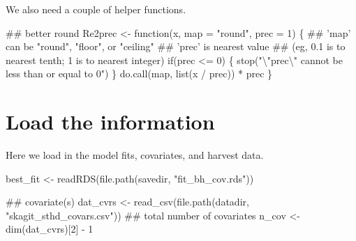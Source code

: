 \documentclass[11pt,]{article}
\newenvironment{Shaded}{}{}
\newcommand{\CharTok}[1]{\textcolor[rgb]{0.00,0.50,0.50}{#1}}
\newcommand{\CommentTok}[1]{\textcolor[rgb]{0.00,0.50,0.00}{#1}}
\newcommand{\ControlFlowTok}[1]{\textcolor[rgb]{0.00,0.00,1.00}{#1}}
\newcommand{\DataTypeTok}[1]{#1}
\newcommand{\DecValTok}[1]{#1}
\newcommand{\KeywordTok}[1]{\textcolor[rgb]{0.00,0.00,1.00}{#1}}
\newcommand{\NormalTok}[1]{#1}
\newcommand{\OperatorTok}[1]{#1}
\newcommand{\StringTok}[1]{\textcolor[rgb]{0.00,0.50,0.50}{#1}}
\begin{document}
We also need a couple of helper functions.

\begin{Shaded}
\begin{Highlighting}[]
\CommentTok{## better round}
\NormalTok{Re2prec <-}\StringTok{ }\ControlFlowTok{function}\NormalTok{(x, }\DataTypeTok{map =} \StringTok{"round"}\NormalTok{, }\DataTypeTok{prec =} \DecValTok{1}\NormalTok{) \{}
  \CommentTok{## 'map' can be "round", "floor", or "ceiling"}
  \CommentTok{## 'prec' is nearest value}
  \CommentTok{## (eg, 0.1 is to nearest tenth; 1 is to nearest integer)}
  \ControlFlowTok{if}\NormalTok{(prec }\OperatorTok{<=}\StringTok{ }\DecValTok{0}\NormalTok{) \{}
    \KeywordTok{stop}\NormalTok{(}\StringTok{"}\CharTok{\textbackslash{}"}\StringTok{prec}\CharTok{\textbackslash{}"}\StringTok{ cannot be less than or equal to 0"}\NormalTok{)}
\NormalTok{  \}}
  \KeywordTok{do.call}\NormalTok{(map, }\KeywordTok{list}\NormalTok{(x }\OperatorTok{/}\StringTok{ }\NormalTok{prec)) }\OperatorTok{*}\StringTok{ }\NormalTok{prec}
\NormalTok{\}}
\end{Highlighting}
\end{Shaded}

\hypertarget{load-the-information}{%
\section{Load the information}\label{load-the-information}}

Here we load in the model fits, covariates, and harvest data.

\begin{Shaded}
\begin{Highlighting}[]
\NormalTok{best_fit <-}\StringTok{ }\KeywordTok{readRDS}\NormalTok{(}\KeywordTok{file.path}\NormalTok{(savedir, }\StringTok{"fit_bh_cov.rds"}\NormalTok{))}
\end{Highlighting}
\end{Shaded}

\begin{Shaded}
\begin{Highlighting}[]
\CommentTok{## covariate(s)}
\NormalTok{dat_cvrs <-}\StringTok{ }\KeywordTok{read_csv}\NormalTok{(}\KeywordTok{file.path}\NormalTok{(datadir, }\StringTok{"skagit_sthd_covars.csv"}\NormalTok{))}
\CommentTok{## total number of covariates}
\NormalTok{n_cov <-}\StringTok{ }\KeywordTok{dim}\NormalTok{(dat_cvrs)[}\DecValTok{2}\NormalTok{] }\OperatorTok{-}\StringTok{ }\DecValTok{1}
\end{Highlighting}
\end{Shaded}
\end{document}
